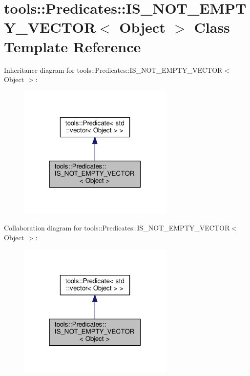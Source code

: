 \hypertarget{classtools_1_1Predicates_1_1IS__NOT__EMPTY__VECTOR}{}\section{tools\+:\+:Predicates\+:\+:I\+S\+\_\+\+N\+O\+T\+\_\+\+E\+M\+P\+T\+Y\+\_\+\+V\+E\+C\+T\+OR$<$ Object $>$ Class Template Reference}
\label{classtools_1_1Predicates_1_1IS__NOT__EMPTY__VECTOR}


Inheritance diagram for tools\+:\+:Predicates\+:\+:I\+S\+\_\+\+N\+O\+T\+\_\+\+E\+M\+P\+T\+Y\+\_\+\+V\+E\+C\+T\+OR$<$ Object $>$\+:
\nopagebreak
\begin{figure}[H]
\begin{center}
\leavevmode
\includegraphics[width=220pt]{classtools_1_1Predicates_1_1IS__NOT__EMPTY__VECTOR__inherit__graph}
\end{center}
\end{figure}


Collaboration diagram for tools\+:\+:Predicates\+:\+:I\+S\+\_\+\+N\+O\+T\+\_\+\+E\+M\+P\+T\+Y\+\_\+\+V\+E\+C\+T\+OR$<$ Object $>$\+:
\nopagebreak
\begin{figure}[H]
\begin{center}
\leavevmode
\includegraphics[width=220pt]{classtools_1_1Predicates_1_1IS__NOT__EMPTY__VECTOR__coll__graph}
\end{center}
\end{figure}
